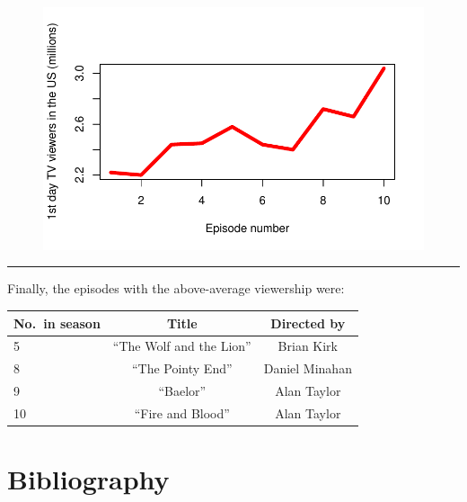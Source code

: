 \documentclass[
  11pt,
]{article}
\begin{document}
\begin{figure}[H]

{\centering \includegraphics{Assignment_files/figure-pdf/viewers_plot-1.pdf}

}

\end{figure}

\begin{center}\rule{0.5\linewidth}{0.5pt}\end{center}

Finally, the episodes with the above-average viewership were:

\begin{longtable}[]{@{}lcc@{}}
\toprule()
No.~in season & Title & Directed by \\
\midrule()
\endhead
5 & ``The Wolf and the Lion'' & Brian Kirk \\
8 & ``The Pointy End'' & Daniel Minahan \\
9 & ``Baelor'' & Alan Taylor \\
10 & ``Fire and Blood'' & Alan Taylor \\
\bottomrule()
\end{longtable}

\hypertarget{bibliography}{%
\section{Bibliography}\label{bibliography}}
\end{document}
